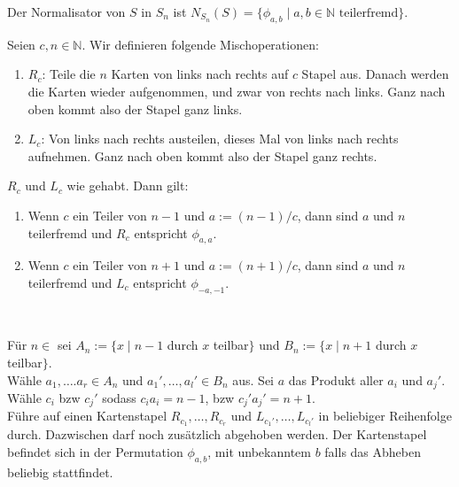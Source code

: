 \documentclass[a4paper]{article}
\newcommand{\N}{\mathbb{N}}
\begin{document}
    \begin{satz}[4.5]
            Der Normalisator von $S$ in $S_n$ ist $N_{S_n}(S) = \{\phi_{a, b}  \mid a, b \in \N \text{ teilerfremd}\}$.
       
    \end{satz}
    \begin{bemerkung}[5.1] 
    Seien $c,n \in \mathbb{N}$. Wir definieren folgende Mischoperationen: 
    \begin{enumerate}
     \item $R_c$: Teile die $n$ Karten von links nach rechts auf $c$ Stapel aus. Danach werden die Karten wieder aufgenommen, und zwar von rechts nach links. Ganz nach oben kommt also der Stapel ganz links.
    \item $L_c$: Von links nach rechts austeilen, dieses Mal von links nach rechts aufnehmen.  Ganz nach oben kommt also der Stapel ganz rechts.
    \end{enumerate}
    \end{bemerkung}   
    
    \begin{satz}[5.2]
    $R_c$ und $L_c$ wie gehabt. Dann gilt:
    \begin{enumerate}
    \item Wenn $c$ ein Teiler von $n - 1$ und $a := (n - 1)/c$, dann sind $a$ und $n$ teilerfremd und $R_c$ entspricht $\phi_{a,a}$.
    \item Wenn $c$ ein Teiler von $n + 1$ und $a := (n + 1)/c$, dann sind $a$ und $n$ teilerfremd und $L_c$ entspricht $\phi_{-a,-1}$.
    \end{enumerate}
    \end{satz} \\
    
    \begin{lemma}[5.3]
    Für $n \in $  sei $A_n := \lbrace x  \mid  n-1$ durch $x$ teilbar$\rbrace$ und $B_n := \lbrace x  \mid  n+1$ durch $x$ teilbar$\rbrace$. \\
    Wähle $a_1, …. a_r \in A_n$ und $a_1', …, a_l' \in B_n$ aus. Sei $a$ das Produkt aller $a_i$ und $a_j'$. Wähle $c_i$ bzw $c_j'$ sodass $c_ia_i = n-1$, bzw $c_j'a_j' = n+1$. \\
    Führe auf einen Kartenstapel $R_{c_1}, …, R_{c_r}$ und $L_{c_1'}, …, L_{c_l'}$ in beliebiger Reihenfolge durch. Dazwischen darf noch zusätzlich abgehoben werden. Der Kartenstapel befindet sich in der Permutation $\phi_{a,b}$, mit unbekanntem $b$ falls das Abheben beliebig stattfindet.
    \end{lemma}
\end{document}
